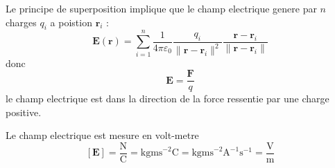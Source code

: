 Le principe de superposition implique que le champ electrique genere par $n$ charges $q_{i}$ a poistion $\boldsymbol{r}_{i}$ :
$$
\boldsymbol{E}(\boldsymbol{r})=\sum_{i=1}^{n} \frac{1}{4\pi\varepsilon_{0}} \frac{q_{i}}{\lVert \boldsymbol{r}-\boldsymbol{r}_{i} \rVert ^{2}} \frac{\boldsymbol{r}-\boldsymbol{r}_{i}}{\lVert \boldsymbol{r}-\boldsymbol{r}_{i} \rVert }
$$
donc 
$$
\boldsymbol{E}=\frac{\boldsymbol{F}}{q}
$$
le champ electrique est dans la direction de la force ressentie par une charge positive.

Le champ electrique est mesure en volt-metre
$$
[\boldsymbol{E}]=\frac{\mathrm{N}}{\mathrm{C}}=\mathrm{kgms}^{-2}\mathrm{C}=\mathrm{kgms}^{-2}\mathrm{A}^{-1}\mathrm{s}^{-1}=\frac{\mathrm{V}}{\mathrm{m}}
$$
